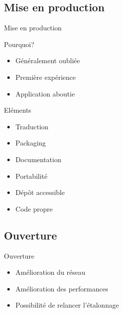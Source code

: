 \documentclass{beamer}
\begin{document}
		\subsection{Mise en production}
		\begin{frame}{Mise en production}
			\begin{block}{Pourquoi?}
				\begin{itemize}
					\item Généralement oubliée
					\item Première expérience
					\item Application aboutie
				\end{itemize}
			\end{block}
			\begin{block}{Eléments}
				\begin{itemize}
					\item Traduction
					\item Packaging
					\item Documentation
					\item Portabilité
					\item Dépôt accessible
					\item Code propre
				\end{itemize}
			\end{block}
		\end{frame}
		
		\subsection{Ouverture}
		\begin{frame}{Ouverture}
			\begin{itemize}
				\item Amélioration du réseau
				\item Amélioration des performances
				\item Possibilité de relancer l'étalonnage
			\end{itemize}
		\end{frame}
		
\end{document}
